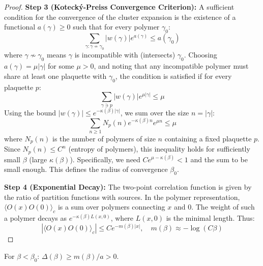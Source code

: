 \begin{proof}
\textbf{Step 3 (Kotecký-Preiss Convergence Criterion):}
A sufficient condition for the convergence of the cluster expansion is the existence of a functional $a(\gamma) \geq 0$ such that for every polymer $\gamma_0$:
\begin{equation}
\sum_{\gamma : \gamma \nsim \gamma_0} |w(\gamma)| e^{a(\gamma)} \leq a(\gamma_0)
\end{equation}
where $\gamma \nsim \gamma_0$ means $\gamma$ is incompatible with (intersects) $\gamma_0$.
Choosing $a(\gamma) = \mu |\gamma|$ for some $\mu > 0$, and noting that any incompatible polymer must share at least one plaquette with $\gamma_0$, the condition is satisfied if for every plaquette $p$:
\begin{equation}
\sum_{\gamma \ni p} |w(\gamma)| e^{\mu |\gamma|} \leq \mu
\end{equation}
Using the bound $|w(\gamma)| \leq e^{-\kappa(\beta) |\gamma|}$, we sum over the size $n = |\gamma|$:
\begin{equation}
\sum_{n \geq 1} N_{p}(n) e^{-\kappa(\beta) n} e^{\mu n} \leq \mu
\end{equation}
where $N_{p}(n)$ is the number of polymers of size $n$ containing a fixed plaquette $p$. Since $N_{p}(n) \leq C^n$ (entropy of polymers), this inequality holds for sufficiently small $\beta$ (large $\kappa(\beta)$). Specifically, we need $C e^{\mu - \kappa(\beta)} < 1$ and the sum to be small enough. This defines the radius of convergence $\beta_0$.

\textbf{Step 4 (Exponential Decay):}
The two-point correlation function is given by the ratio of partition functions with sources. In the polymer representation, $\langle O(x) O(0) \rangle_c$ is a sum over polymers connecting $x$ and $0$. The weight of such a polymer decays as $e^{-\kappa(\beta) L(x,0)}$, where $L(x,0)$ is the minimal length.
Thus:
\begin{equation}
|\langle O(x) O(0) \rangle_c| \leq C e^{-m(\beta)|x|}, \quad m(\beta) \approx -\log(C \beta)
\end{equation}
\end{proof}

\begin{corollary}
For $\beta < \beta_0$: $\Delta(\beta) \geq m(\beta)/a > 0$.
\end{corollary}


